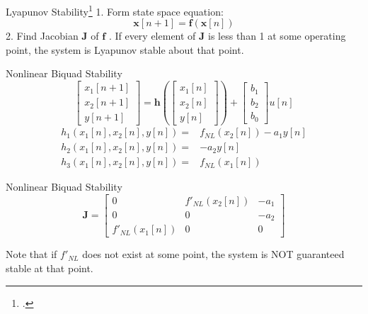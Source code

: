\begin{frame}{Lyapunov Stability\footcite{Lyapunov}}
    1. Form state space equation:
    \begin{equation}
        \mathbf{x}[n+1] = \mathbf{f}(\mathbf{x}[n])
    \end{equation}
    2. Find Jacobian $\mathbf{J}$ of $\mathbf{f}$
    \newline{}. If every element of $\mathbf{J}$ is less than 1
    at some operating point, the system is Lyapunov
    stable about that point.
\end{frame}

\begin{frame}{Nonlinear Biquad Stability}
    \begin{equation}
        \begin{bmatrix} x_1[n+1] \\ x_2[n+1] \\ y[n+1] \end{bmatrix} =
        \mathbf{h} \left( \begin{bmatrix} x_1[n] \\ x_2[n] \\ y[n] \end{bmatrix}
        \right) + \begin{bmatrix} b_1\\ b_2\\ b_0 \end{bmatrix} u[n]
    \end{equation}
    \vspace{3ex}
    \begin{equation}
        \begin{split}
            h_1(x_1[n], x_2[n], y[n]) =& f_{NL}(x_2[n]) - a_1y[n] \\
            h_2(x_1[n], x_2[n], y[n]) =& -a_2y[n] \\
            h_3(x_1[n], x_2[n], y[n]) =& f_{NL}(x_1[n])
        \end{split}
    \end{equation}
\end{frame}

\begin{frame}{Nonlinear Biquad Stability}
    \begin{equation}
        \mathbf{J} = \begin{bmatrix}
            0& f'_{NL}(x_2[n])& -a_1 \\
            0& 0& -a_2 \\
            f'_{NL}(x_1[n])& 0& 0
        \end{bmatrix}
    \end{equation}

    \vspace{3ex}

    Note that if $f'_{NL}$ does not exist at some point,
    the system is NOT guaranteed stable at that point.
\end{frame}

